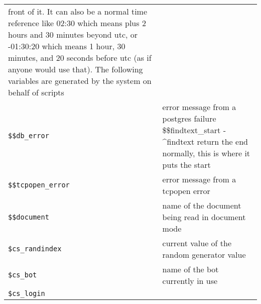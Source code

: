 \documentclass[]{article}
\begin{document}
\begin{longtable}[]{@{}ll@{}}
\begin{minipage}[t]{0.10\columnwidth}
front of it. It can also be a normal time reference like 02:30 which
means plus 2 hours and 30 minutes beyond utc, or -01:30:20 which means 1
hour, 30 minutes, and 20 seconds before utc (as if anyone would use
that). The following variables are generated by the system on behalf of
scripts\strut
\end{minipage}\tabularnewline
\begin{minipage}[t]{0.26\columnwidth}\raggedright\strut
\texttt{\$\$db\_error}\strut
\end{minipage} & \begin{minipage}[t]{0.10\columnwidth}\raggedright\strut
error message from a postgres failure \$\$findtext\_start - \^{}findtext
return the end normally, this is where it puts the start\strut
\end{minipage}\tabularnewline
\begin{minipage}[t]{0.26\columnwidth}\raggedright\strut
\texttt{\$\$tcpopen\_error}\strut
\end{minipage} & \begin{minipage}[t]{0.10\columnwidth}\raggedright\strut
error message from a tcpopen error\strut
\end{minipage}\tabularnewline
\begin{minipage}[t]{0.26\columnwidth}\raggedright\strut
\texttt{\$\$document}\strut
\end{minipage} & \begin{minipage}[t]{0.10\columnwidth}\raggedright\strut
name of the document being read in document mode\strut
\end{minipage}\tabularnewline
\begin{minipage}[t]{0.26\columnwidth}\raggedright\strut
\texttt{\$cs\_randindex}\strut
\end{minipage} & \begin{minipage}[t]{0.10\columnwidth}\raggedright\strut
current value of the random generator value\strut
\end{minipage}\tabularnewline
\begin{minipage}[t]{0.26\columnwidth}\raggedright\strut
\texttt{\$cs\_bot}\strut
\end{minipage} & \begin{minipage}[t]{0.10\columnwidth}\raggedright\strut
name of the bot currently in use\strut
\end{minipage}\tabularnewline
\begin{minipage}[t]{0.26\columnwidth}\raggedright\strut
\texttt{\$cs\_login}\strut
\end{minipage} & \begin{minipage}[t]{0.10\columnwidth}\raggedright\strut

\end{minipage}
\end{longtable}
\end{document}
